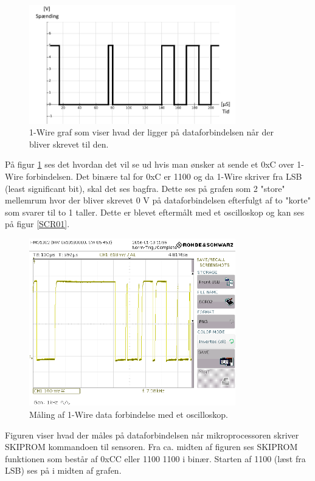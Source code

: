 \begin{figure}[h!]
  \centering
  \includegraphics[width=0.8\textwidth]{figures/onewire.png}
  \caption{1-Wire graf som viser hvad der ligger på dataforbindelsen når der bliver skrevet til den.}
  \label{onewire_graph}
\end{figure}

På figur \ref{onewire_graph} ses det hvordan det vil se ud hvis man ønsker at sende et 0xC over 1-Wire forbindelsen. Det binære tal for 0xC er 1100 og da 1-Wire skriver fra LSB (least significant bit), skal det ses bagfra. Dette ses på grafen som 2 "store" mellemrum hvor der bliver skrevet 0 V på dataforbindelsen efterfulgt af to "korte" som svarer til to 1 taller. Dette er blevet eftermålt med et oscilloskop og kan ses på figur \ref{SCR01}.

\begin{figure}[h!]
  \centering
  \includegraphics[width=0.8\textwidth]{figures/SCR02.png}
  \caption{Måling af 1-Wire data forbindelse med et oscilloskop.}
  \label{SCR02}
\end{figure}

Figuren viser hvad der måles på dataforbindelsen når mikroprocessoren skriver SKIPROM kommandoen til sensoren.
Fra ca. midten af figuren ses SKIPROM funktionen som består af 0xCC eller 1100 1100 i binær. Starten af 1100 (læst fra LSB) ses på i midten af grafen.


